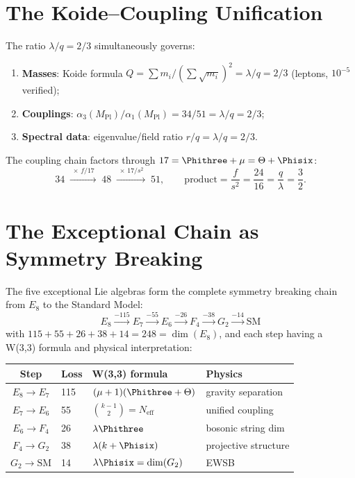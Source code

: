 \section{The Koide--Coupling Unification}
\label{sec:koide-coupling}

\begin{theorem}
The ratio $\lambda/q = 2/3$ simultaneously governs:
\begin{enumerate}[nosep]
\item \textbf{Masses}: Koide formula
  $Q = \sum m_i/(\sum\sqrt{m_i})^2 = \lambda/q = 2/3$ (leptons, $10^{-5}$ verified);
\item \textbf{Couplings}: $\alpha_3(M_{\mathrm{Pl}})/\alpha_1(M_{\mathrm{Pl}}) = 34/51 = \lambda/q = 2/3$;
\item \textbf{Spectral data}: eigenvalue/field ratio $r/q = \lambda/q = 2/3$.
\end{enumerate}
\end{theorem}

The coupling chain factors through $17 = \Phithree+\mu = \Theta+\Phisix$:
\begin{equation}
34 \;\xrightarrow{\;\times\,f/17\;}\; 48
\;\xrightarrow{\;\times\,17/s^2\;}\; 51, \qquad
\text{product} = \frac{f}{s^2} = \frac{24}{16} = \frac{q}{\lambda} = \frac{3}{2}.
\end{equation}


\section{The Exceptional Chain as Symmetry Breaking}
\label{sec:exceptional-chain}

\begin{theorem}
The five exceptional Lie algebras form the complete symmetry
breaking chain from $E_8$ to the Standard Model:
\begin{equation}
\boxed{
E_8 \xrightarrow{-115} E_7 \xrightarrow{-55} E_6
\xrightarrow{-26} F_4 \xrightarrow{-38} G_2 \xrightarrow{-14} \mathrm{SM}
}
\end{equation}
with $115+55+26+38+14 = 248 = \dim(E_8)$, and each step having a
W(3,3) formula and physical interpretation:
\end{theorem}

\begin{center}
\begin{tabular}{@{}clll@{}}
\toprule
\textbf{Step} & \textbf{Loss} & \textbf{W(3,3) formula} & \textbf{Physics} \\
\midrule
$E_8\to E_7$ & 115 & $(\mu+1)(\Phithree+\Theta)$ & gravity separation \\
$E_7\to E_6$ & 55 & $\binom{k-1}{2} = N_{\mathrm{eff}}$ & unified coupling \\
$E_6\to F_4$ & 26 & $\lambda\Phithree$ & bosonic string dim \\
$F_4\to G_2$ & 38 & $\lambda(k+\Phisix)$ & projective structure \\
$G_2\to\mathrm{SM}$ & 14 & $\lambda\Phisix = \dim(G_2)$ & EWSB \\
\bottomrule
\end{tabular}
\end{center}

